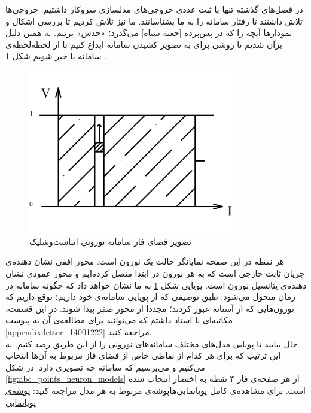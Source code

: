 	\label{chap:animations}
در فصل‌های گذشته تنها با ثبت عددی خروجی‌های مدلسازی سروکار داشتیم. خروجی‌ها تلاش داشتند تا رفتار سامانه را به ما بشناسانند. ما نیز تلاش کردیم تا بررسی اشکال و نمودارها آنچه را که در پس‌پرده [جعبه سیاه] می‌گذرد؛ «حدس» بزنیم. به همین دلیل برآن شدیم تا روشی برای به تصویر کشیدن سامانه ابداع کنیم تا از لحظه‌لحظه‌ی سامانه با خبر شویم شکل \ref{fig:if_animation_plot}
.
\begin{figure}[!h]
	\centering
	\includegraphics[width =0.8\textwidth]{../papers_studies/figs/IF/IF_phase_space-Model.png}
	\caption{تصویر فضای فاز سامانه نورونی انباشت‌وشلیک}
	\label{fig:if_animation_plot}
\end{figure}

هر نقطه در این صفحه نمایانگر حالت یک نورون است. محور افقی نشان دهنده‌ی جریان ثابت خارجی است که به هر نورون در ابتدا متصل کرده‌ایم و محور عمودی نشان دهنده‌ی پتانسیل نورون است. پویایی شکل \ref{fig:if_animation_plot} به ما نشان خواهد داد که چگونه سامانه در زمان متحول می‌شود. طبق توصیفی که از پویایی سامانه‌ی خود داریم؛ توقع داریم که نورون‌هایی که از آستانه عبور کردند؛ مجددا از محور صفر پیدا شوند. در این قسمت، مکاتبه‌ای با استاد داشتم که می‌توانید برای مطالعه‌ی آن به پیوست 
\ref{appendix:letter_14001222}
مراجعه کنید.\\
حال بیایید تا پویایی مدل‌های مختلف سامانه‌های نورونی را از این طریق رصد کنیم. به این ترتیب که برای هر کدام از نقاطی خاص از فضای فاز مربوط به آن‌ها انتخاب می‌کنیم و می‌پرسیم که سامانه چه تصویری دارد. در شکل‌ 
\ref{fig:abc_points_neuron_models}
از هر صفحه‌ی فاز ۴ نقطه به اختصار انتخاب شده است. برای مشاهده‌ی کامل پویانمایی‌هاپوشه‌ی مربوط به هر مدل مراجعه کنید:
\href{https://drive.google.com/drive/folders/1iVuTAHkgfAb0rMtq1JORQ8NchS0IOrS2?usp=sharing}{پوشه‌ی پویانمایی}

